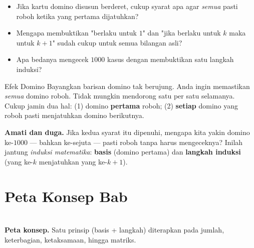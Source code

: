 \documentclass[11pt,a4paper]{report}
\theoremstyle{gaya}
\begin{document}
\begin{pemantik}
\begin{itemize}[leftmargin=*,topsep=2pt]
  \item Jika kartu domino disusun berderet, cukup syarat apa agar \emph{semua} pasti roboh ketika yang pertama dijatuhkan?
  \item Mengapa membuktikan "berlaku untuk $1$" dan "jika berlaku untuk $k$ maka untuk $k+1$" sudah cukup untuk semua bilangan asli?
  \item Apa bedanya mengecek $1000$ kasus dengan membuktikan satu langkah induksi?
\end{itemize}
\end{pemantik}

\begin{studikasus}{Efek Domino}
Bayangkan barisan domino tak berujung. Anda ingin memastikan \emph{semua} domino roboh. Tidak mungkin mendorong satu per satu selamanya. Cukup jamin dua hal: (1) domino \textbf{pertama} roboh; (2) \textbf{setiap} domino yang roboh pasti menjatuhkan domino berikutnya.
\smallskip

\textbf{Amati dan duga.} Jika kedua syarat itu dipenuhi, mengapa kita yakin domino ke-$1000$ --- bahkan ke-sejuta --- pasti roboh tanpa harus mengeceknya? Inilah jantung \emph{induksi matematika}: \textbf{basis} (domino pertama) dan \textbf{langkah induksi} (yang ke-$k$ menjatuhkan yang ke-$k+1$).
\end{studikasus}

\section*{Peta Konsep Bab}
\begin{center}
\\
\small \textbf{Peta konsep.} Satu prinsip (basis + langkah) diterapkan pada jumlah, keterbagian, ketaksamaan, hingga matriks.
\end{center}
\end{document}
